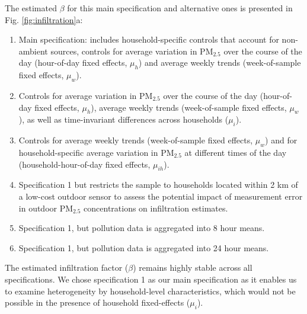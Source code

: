 \documentclass[9pt,twocolumn,twoside]{pnas-new}
\begin{document}
The estimated $\beta$ for this main specification and alternative ones is presented in Fig. \ref{fig:infiltration}a: 
\begin{enumerate}
    \item Main specification: includes household-specific controls that account for non-ambient sources, controls for average variation in PM$_{2.5}$ over the course of the day (hour-of-day fixed effects, $\mu_h$) and average weekly trends (week-of-sample fixed effects, $\mu_w$).
    \item Controls for average variation in PM$_{2.5}$ over the course of the day (hour-of-day fixed effects, $\mu_h$),  average weekly trends (week-of-sample fixed effects, $\mu_w$), as well as time-invariant differences across households ($\mu_i$).
    \item Controls for average weekly trends (week-of-sample fixed effects, $\mu_w$) and for household-specific average variation in PM$_{2.5}$ at different times of the day (household-hour-of-day fixed effects, $\mu_{ih}$).
    \item Specification 1 but restricts the sample to households located within 2 km of a low-cost outdoor sensor to assess the potential impact of measurement error in outdoor PM$_{2.5}$ concentrations on infiltration estimates.
    \item Specification 1, but pollution data is aggregated into 8 hour means. 
    \item Specification 1, but pollution data is aggregated into 24 hour means. 
\end{enumerate}

The estimated infiltration factor ($\beta$) remains highly stable across all specifications. We chose specification 1 as our main specification as it enables us to examine heterogeneity by household-level characteristics, which would not be possible in the presence of household fixed-effects ($\mu_i$). 
\\ 
\end{document}
